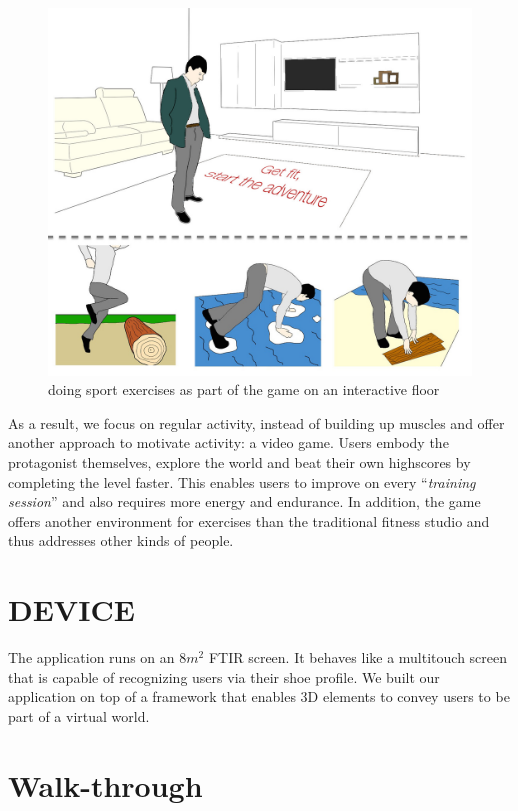 \documentclass{sigchi}
\begin{document}
  \begin{figure}[!t]
    \centering
    \includegraphics[width=\columnwidth]{roto_main_2}
    \caption{doing sport exercises as part of the game on an interactive floor}
    \label{fig:figure1}
  \end{figure}

    As a result, we focus on regular activity, instead of building up muscles and offer another approach to motivate activity: a video game. Users embody the protagonist themselves, explore the world and beat their own highscores by completing the level faster. This enables users to improve on every ``\emph{training session}'' and also requires more energy and endurance. In addition, the game offers another environment for exercises than the traditional fitness studio and thus addresses other kinds of people.


  \section{DEVICE}
    The application runs on an $8m^2$ FTIR screen. It behaves like a multitouch screen that is capable of recognizing users via their shoe profile. We built our application on top of a framework that enables 3D elements to convey users to be part of a virtual world.


\section{Walk-through}
\end{document}
